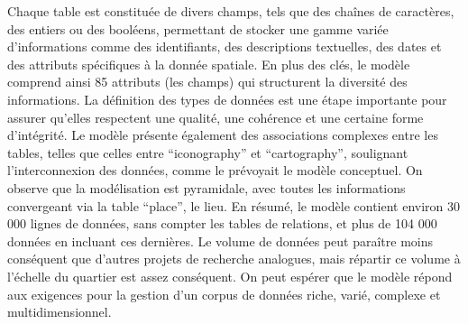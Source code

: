 Chaque table est constituée de divers champs, tels que des chaînes de caractères, des entiers ou des booléens, permettant de stocker une gamme variée d'informations comme des identifiants, des descriptions textuelles, des dates et des attributs spécifiques à la donnée spatiale. En plus des clés, le modèle comprend ainsi 85 attributs (les champs) qui structurent la diversité des informations. La définition des types de données est une étape importante pour assurer qu'elles respectent une qualité, une cohérence et une certaine forme d'intégrité. Le modèle présente également des associations complexes entre les tables, telles que celles entre \enquote{iconography} et \enquote{cartography}, soulignant l'interconnexion des données, comme le prévoyait le modèle conceptuel. On observe que la modélisation est pyramidale, avec toutes les informations convergeant via la table \enquote{place}, le lieu. En résumé, le modèle contient environ 30 000 lignes de données, sans compter les tables de relations, et plus de 104 000 données en incluant ces dernières. Le volume de données peut paraître moins conséquent que d'autres projets de recherche analogues, mais répartir ce volume à l'échelle du quartier est assez conséquent. On peut espérer que le modèle répond aux exigences pour la gestion d'un corpus de données riche, varié, complexe et multidimensionnel.

